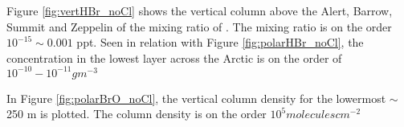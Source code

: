 \medskip

Figure \ref{fig:vertHBr_noCl} shows the vertical column above the Alert, Barrow, Summit and Zeppelin of the mixing ratio of . The mixing ratio is on the order $10^{-15} \sim 0.001$ ppt. Seen in relation with Figure \ref{fig:polarHBr_noCl}, the concentration in the lowest layer across the Arctic is on the order of $10^{-10} - 10^{-11} g m^{-3}$

\medskip

In Figure \ref{fig:polarBrO_noCl}, the vertical column density for the lowermost $\sim$ 250 m is plotted. The column density is on the order $10^{5} molecules cm^{-2}$








%

%

%

%







